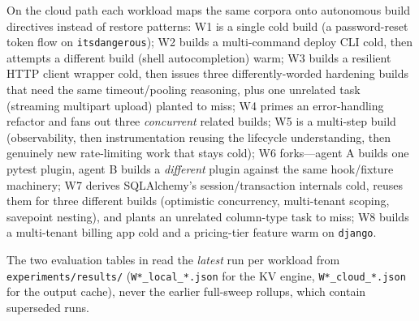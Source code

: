 \documentclass[10pt]{article}
\begin{document}
On the cloud path each workload maps the same corpora onto autonomous build
directives instead of restore patterns: W1 is a single cold build (a
password-reset token flow on \texttt{itsdangerous}); W2 builds a
multi-command deploy CLI cold, then attempts a different build (shell
autocompletion) warm; W3 builds a resilient HTTP client wrapper cold, then
issues three differently-worded hardening builds that need the same
timeout/pooling reasoning, plus one unrelated task (streaming multipart
upload) planted to miss; W4 primes an error-handling refactor and fans out
three \emph{concurrent} related builds; W5 is a multi-step build
(observability, then instrumentation reusing the lifecycle understanding, then
genuinely new rate-limiting work that stays cold); W6 forks---agent A builds
one pytest plugin, agent B builds a \emph{different} plugin against the same
hook/fixture machinery; W7 derives SQLAlchemy's session/transaction internals
cold, reuses them for three different builds (optimistic concurrency,
multi-tenant scoping, savepoint nesting), and plants an unrelated
column-type task to miss; W8 builds a multi-tenant billing app cold and a
pricing-tier feature warm on \texttt{django}.

The two evaluation tables in  read the \emph{latest} run per
workload from \texttt{experiments/results/} (\texttt{W*\_local\_*.json} for the
KV engine, \texttt{W*\_cloud\_*.json} for the output cache), never the earlier
full-sweep rollups, which contain superseded runs.
\end{document}
